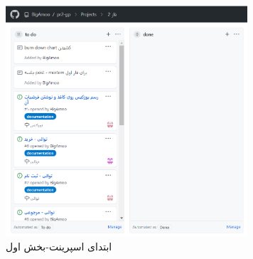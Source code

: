 \documentclass[12pt,a4paper]{article}
\begin{document}
\pagebreak
	\subsection{} \label{section.report.taskBoard}
			\begin{figure}[h!]
			\begin{center}
				\includegraphics[width=9cm]{images/screenshot_1.png}	
			\end{center}
			\caption{ابتدای اسپرینت-بخش اول}
		\end{figure}
		
\end{document}
